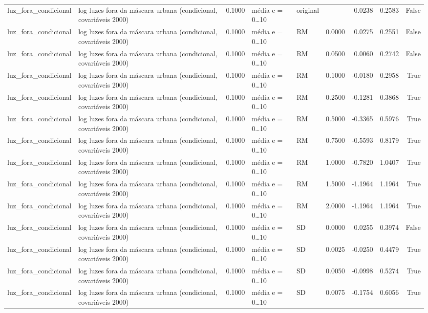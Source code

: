 \begin{table}
{\begin{tabular}{llrllrrrr}
luz\_fora\_condicional & log luzes fora da máscara urbana (condicional, covariáveis 2000) & 0.1000 & média e = 0…10 & original & — & 0.0238 & 0.2583 & False \\
luz\_fora\_condicional & log luzes fora da máscara urbana (condicional, covariáveis 2000) & 0.1000 & média e = 0…10 & RM & 0.0000 & 0.0275 & 0.2551 & False \\
luz\_fora\_condicional & log luzes fora da máscara urbana (condicional, covariáveis 2000) & 0.1000 & média e = 0…10 & RM & 0.0500 & 0.0060 & 0.2742 & False \\
luz\_fora\_condicional & log luzes fora da máscara urbana (condicional, covariáveis 2000) & 0.1000 & média e = 0…10 & RM & 0.1000 & -0.0180 & 0.2958 & True \\
luz\_fora\_condicional & log luzes fora da máscara urbana (condicional, covariáveis 2000) & 0.1000 & média e = 0…10 & RM & 0.2500 & -0.1281 & 0.3868 & True \\
luz\_fora\_condicional & log luzes fora da máscara urbana (condicional, covariáveis 2000) & 0.1000 & média e = 0…10 & RM & 0.5000 & -0.3365 & 0.5976 & True \\
luz\_fora\_condicional & log luzes fora da máscara urbana (condicional, covariáveis 2000) & 0.1000 & média e = 0…10 & RM & 0.7500 & -0.5593 & 0.8179 & True \\
luz\_fora\_condicional & log luzes fora da máscara urbana (condicional, covariáveis 2000) & 0.1000 & média e = 0…10 & RM & 1.0000 & -0.7820 & 1.0407 & True \\
luz\_fora\_condicional & log luzes fora da máscara urbana (condicional, covariáveis 2000) & 0.1000 & média e = 0…10 & RM & 1.5000 & -1.1964 & 1.1964 & True \\
luz\_fora\_condicional & log luzes fora da máscara urbana (condicional, covariáveis 2000) & 0.1000 & média e = 0…10 & RM & 2.0000 & -1.1964 & 1.1964 & True \\
luz\_fora\_condicional & log luzes fora da máscara urbana (condicional, covariáveis 2000) & 0.1000 & média e = 0…10 & SD & 0.0000 & 0.0255 & 0.3974 & False \\
luz\_fora\_condicional & log luzes fora da máscara urbana (condicional, covariáveis 2000) & 0.1000 & média e = 0…10 & SD & 0.0025 & -0.0250 & 0.4479 & True \\
luz\_fora\_condicional & log luzes fora da máscara urbana (condicional, covariáveis 2000) & 0.1000 & média e = 0…10 & SD & 0.0050 & -0.0998 & 0.5274 & True \\
luz\_fora\_condicional & log luzes fora da máscara urbana (condicional, covariáveis 2000) & 0.1000 & média e = 0…10 & SD & 0.0075 & -0.1754 & 0.6056 & True \\

\end{tabular}}
\end{table}

